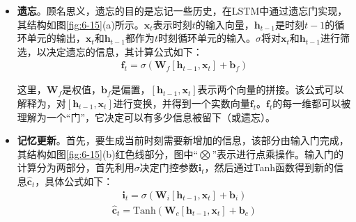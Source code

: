 \begin{itemize}
\vspace{0.5em}
\item {\small\sffamily\bfseries{遗忘}}。顾名思义，遗忘的目的是忘记一些历史，在LSTM中通过遗忘门实现，其结构如图\ref{fig:6-15}(a)所示。$\mathbf{x}_{t}$表示时刻$t$的输入向量，$\mathbf{h}_{t-1}$是时刻$t-1$的循环单元的输出，$\mathbf{x}_{t}$和$\mathbf{h}_{t-1}$都作为$t$时刻循环单元的输入。$\sigma$将对$\mathbf{x}_{t}$和$\mathbf{h}_{t-1}$进行筛选，以决定遗忘的信息，其计算公式如下：
\begin{eqnarray}
\mathbf{f}_t=\sigma(\mathbf{W}_f [\mathbf{h}_{t-1},\mathbf{x}_{t}] + \mathbf{b}_f )
\label{eq:6-12}
\end{eqnarray}

这里，$\mathbf{W}_f$是权值，$\mathbf{b}_f$是偏置，$[\mathbf{h}_{t-1},\mathbf{x}_{t}]$表示两个向量的拼接。该公式可以解释为，对$[\mathbf{h}_{t-1},\mathbf{x}_{t}]$进行变换，并得到一个实数向量$\mathbf{f}_t$。$\mathbf{f}_t$的每一维都可以被理解为一个``门''，它决定可以有多少信息被留下（或遗忘）。
\vspace{0.5em}
\item {\small\sffamily\bfseries{记忆更新}}。首先，要生成当前时刻需要新增加的信息，该部分由输入门完成，其结构如图\ref{fig:6-15}(b)红色线部分，图中``$\bigotimes$''表示进行点乘操作。输入门的计算分为两部分，首先利用$\sigma$决定门控参数$\mathbf{i}_t$，然后通过Tanh函数得到新的信息$\hat{\mathbf{c}}_t$，具体公式如下：
\begin{eqnarray}
\mathbf{i}_t = \sigma (\mathbf{W}_i [\mathbf{h}_{t-1},\mathbf{x}_{t}] + \mathbf{b}_i )
\label{eq:6-13}
\end{eqnarray}
\begin{eqnarray}
\hat{\mathbf{c}}_t = \textrm{Tanh} (\mathbf{W}_c [\mathbf{h}_{t-1},\mathbf{x}_{t}] + \mathbf{b}_c )
\label{eq:6-14}
\end{eqnarray}


\end{itemize}
